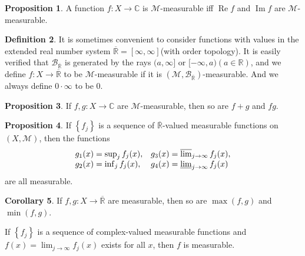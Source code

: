 \documentclass[12pt,a4paper]{book}
\theoremstyle{definition}
\newtheorem{defn}{Definition}[section]
\newtheorem{coro}[defn]{Corollary}
\newtheorem{prop}[defn]{Proposition}
\begin{document}
\begin{prop}
    A function $f: X \rightarrow \mathbb{C}$ is $\mathcal{M}$-measurable iff $\operatorname{Re} f$ and $\operatorname{Im} f$ are $\mathcal{M}$-measurable.
\end{prop}
\begin{defn}
    It is sometimes convenient to consider functions with values in the extended real number system $\overline{\mathbb{R}}=[\infty, \infty]$(with order topology).
    It is easily verified that $\mathcal{B}_{\overline{\mathbb{R}}}$ is generated by the rays $(a, \infty]$ or $[-\infty, a)(a \in \mathbb{R})$, and
    we define $f: X \rightarrow \overline{\mathbb{R}}$ to be $\mathcal{M}$-measurable if it is $\left(\mathcal{M}, \mathcal{B}_{\overline{\mathbb{R}}}\right)$-measurable.
    And we always define $0 \cdot \infty$ to be 0.
\end{defn}
\begin{prop}
    If $f, g: X \rightarrow \mathbb{C}$ are $\mathcal{M}$-measurable, then so are $f+g$ and $f g$.
\end{prop}
\begin{prop}
    If $\left\{f_j\right\}$ is a sequence of $\overline{\mathbb{R}}$-valued measurable functions on $(X, \mathcal{M})$, then the functions
    $$
        \begin{array}{ll}
            g_1(x)=\sup _j f_j(x), & g_3(x)=\varlimsup_{j\to \infty}  f_j(x), \\
            g_2(x)=\inf _j f_j(x), & g_4(x)=\varliminf_{j\to \infty} f_j(x)
        \end{array}
    $$
    are all measurable.
\end{prop}
\begin{coro}
    If $f, g: X \rightarrow \overline{\mathbb{R}}$ are measurable, then so are $\max (f, g)$ and $\min (f, g)$.

    If $\left\{f_j\right\}$ is a sequence of complex-valued measurable functions and $f(x)=\lim _{j \rightarrow \infty} f_j(x)$ exists for all $x$, then $f$ is measurable.
\end{coro}
\end{document}
